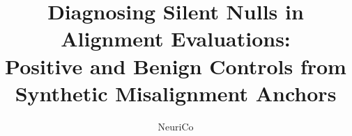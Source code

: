 \documentclass{article}
\title{Diagnosing Silent Nulls in Alignment Evaluations:\\ Positive and Benign Controls from Synthetic Misalignment Anchors}
\author{NeuriCo}
\begin{document}
\maketitle

\begin{abstract}

\end{abstract}










\appendix

\end{document}
